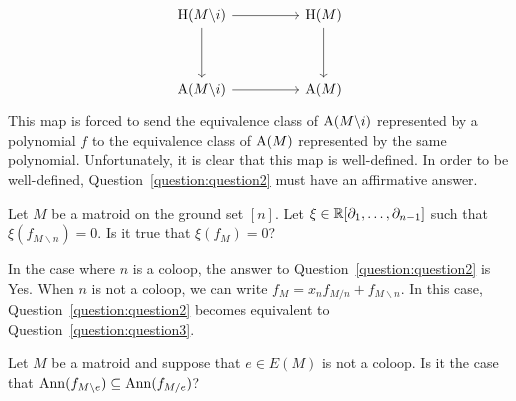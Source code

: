 \documentclass{puthesis-UG}
\begin{document}
\begin{equation} \label{eqn:mobius-basis-ring-injection}
	\begin{tikzcd}
	{\operatorname{H}(M\backslash i)} && {\operatorname{H} (M)} \\
	\\
	{\operatorname{A}(M\backslash i)} && {\operatorname{A}(M)}
	\arrow[from=1-1, to=1-3]
	\arrow[from=1-3, to=3-3]
	\arrow[from=1-1, to=3-1]
	\arrow[from=3-1, to=3-3]
\end{tikzcd}
\end{equation}
This map is forced to send the equivalence class of $\operatorname{A}(M \backslash i)$ represented by a polynomial $f$ to the equivalence class of $\operatorname{A}(M)$ represented by the same polynomial. Unfortunately, it is clear that this map is well-defined. In order to be well-defined, Question~\ref{question:question2} must have an affirmative answer. 

\begin{question} \label{question:question2}
	Let $M$ be a matroid on the ground set $[n]$. Let $\xi \in \mathbb{R}[\partial_1, \ldots, \partial_{n-1}]$ such that $\xi (f_{M \backslash n}) = 0$. Is it true that $\xi (f_M) = 0$? 
\end{question}

In the case where $n$ is a coloop, the answer to Question~\ref{question:question2} is Yes. When $n$ is not a coloop, we can write $f_M = x_n f_{M / n} + f_{M \backslash n}$. In this case, Question~\ref{question:question2} becomes equivalent to Question~\ref{question:question3}. 

\begin{question} \label{question:question3}
 	Let $M$ be a matroid and suppose that $e \in E(M)$ is not a coloop. Is it the case that $\operatorname{Ann} (f_{M \backslash e}) \subseteq \operatorname{Ann} (f_{M / e})$? 
\end{question}
\end{document}
